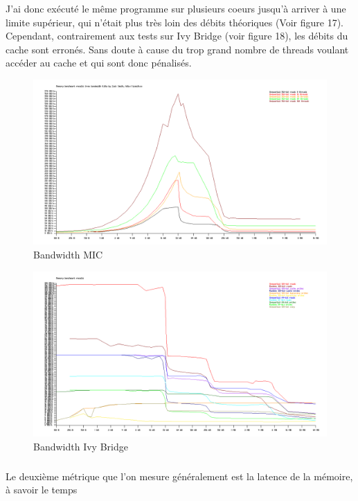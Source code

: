 \documentclass{article}
\begin{document}
					J'ai donc exécuté le même programme sur plusieurs coeurs jusqu'à arriver à une limite supérieur, qui 
					n'était plus très loin des débits théoriques (Voir figure 17). Cependant, contrairement aux tests sur 
					Ivy Bridge (voir figure 18), les débits du cache sont erronés. Sans doute à cause du trop grand nombre 
					de threads voulant accéder au cache et qui sont donc pénalisés.
					\begin{figure}
					\begin{center}
					\includegraphics[scale=0.33]{bandwidth_MICO3.png}
					\caption{Bandwidth MIC}
					\end{center}
					\end{figure}
					\begin{figure}
					\begin{center}
					\includegraphics[scale=0.33]{bandwidth_IVYO3.png}
					\caption{Bandwidth Ivy Bridge}
					\end{center}
					\end{figure}
					\subparagraph{}
					Le deuxième métrique que l'on mesure généralement est la latence de la mémoire, à savoir le temps
\end{document}
